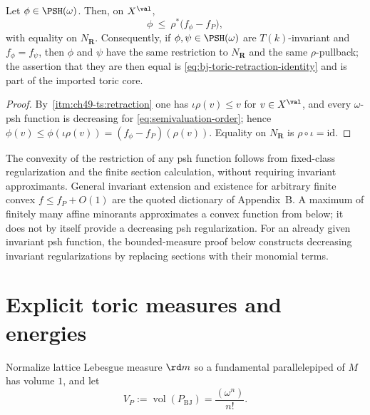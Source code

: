 \begin{lemma}
\label{lem:ch49-toric-retraction-dominates}
Let $\phi\in\PSH(\omega)$.  Then, on $X^{\val}$,
\[
 \phi\ \le\ \rho^*\bigl(f_\phi-f_P\bigr),
\]
with equality on $N_{\mathbf R}$.  Consequently, if
$\phi,\psi\in\PSH(\omega)$ are $T(k)$-invariant and
$f_\phi=f_\psi$, then $\phi$ and $\psi$ have the same restriction to
$N_{\mathbf R}$ and the same $\rho$-pullback; the assertion that they
are then equal is
\eqref{eq:bj-toric-retraction-identity} and is part of the imported toric
core.
\end{lemma}

\begin{proof}
By \,\cref{itm:ch49-ts:retraction} one has
$\iota\rho(v)\le v$ for $v\in X^{\val}$, and every $\omega$-psh
function is decreasing for \eqref{eq:semivaluation-order}; hence
$\phi(v)\le\phi(\iota\rho(v))=(f_\phi-f_P)(\rho(v))$.  Equality on
$N_{\mathbf R}$ is $\rho\circ\iota=\mathrm{id}$.
\end{proof}

\begin{remark}
\label{rem:ch49-toric-core-use}
The convexity of the restriction of any psh function follows from
fixed-class regularization and the finite section calculation, without
requiring invariant approximants.  General invariant extension and
existence for arbitrary finite convex $f\le f_P+O(1)$ are the quoted
dictionary of Appendix~B.  A maximum of finitely many affine minorants
approximates a convex function from below; it does not by itself provide
a decreasing psh regularization.  For an already given invariant psh
function, the bounded-measure proof below constructs decreasing invariant
regularizations by replacing sections with their monomial terms.
\end{remark}

\section{Explicit toric measures and energies}
\label{sec:ch49-toric-ma}

Normalize lattice Lebesgue measure $\rd m$ so a fundamental parallelepiped
of $M$ has volume $1$, and let
\[
                         V_P:=\operatorname{vol}(P_{\mathrm{BJ}})
                            =\frac{(\omega^n)}{n!}.
\tag{49.30}\label{eq:bj-toric-volume}
\]

